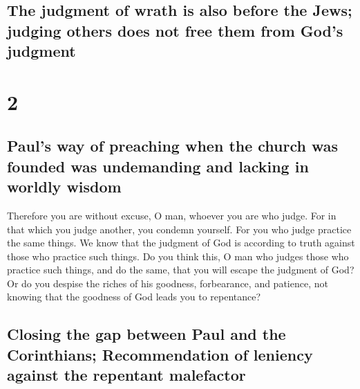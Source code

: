 \begin{paracol}{2}
\switchcolumn
\begin{otherlanguage}{english}

\hypertarget{the-judgment-of-wrath-is-also-before-the-jews-judging-others-does-not-free-them-from-gods-judgment}{%
\subsection{The judgment of wrath is also before the Jews; judging
others does not free them from God's
judgment}\label{the-judgment-of-wrath-is-also-before-the-jews-judging-others-does-not-free-them-from-gods-judgment}}

\hypertarget{section-3}{%
\section{2}\label{section-3}}

\hypertarget{pauls-way-of-preaching-when-the-church-was-founded-was-undemanding-and-lacking-in-worldly-wisdom}{%
\subsection{Paul's way of preaching when the church was founded was
undemanding and lacking in worldly
wisdom}\label{pauls-way-of-preaching-when-the-church-was-founded-was-undemanding-and-lacking-in-worldly-wisdom}}

 Therefore you are without excuse, O man, whoever you are
who judge. For in that which you judge another, you condemn yourself.
For you who judge practice the same things.  We know that
the judgment of God is according to truth against those who practice
such things.  Do you think this, O man who judges those
who practice such things, and do the same, that you will escape the
judgment of God?  Or do you despise the riches of his
goodness, forbearance, and patience, not knowing that the goodness of
God leads you to repentance?

\hypertarget{closing-the-gap-between-paul-and-the-corinthians-recommendation-of-leniency-against-the-repentant-malefactor}{%
\subsection{Closing the gap between Paul and the Corinthians;
Recommendation of leniency against the repentant
malefactor}\label{closing-the-gap-between-paul-and-the-corinthians-recommendation-of-leniency-against-the-repentant-malefactor}}


\end{otherlanguage}
\end{paracol}
